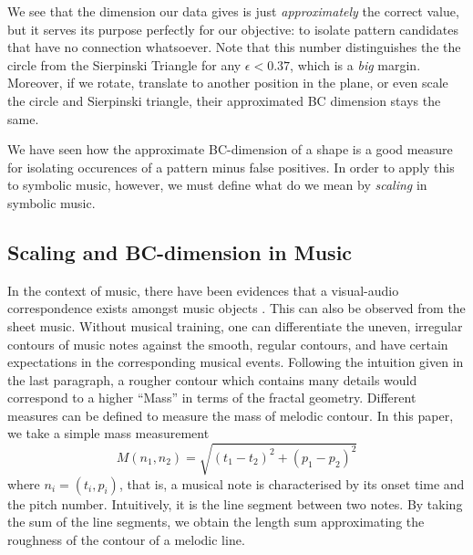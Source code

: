   We see that the dimension our data gives is just
\emph{approximately} the correct value, but it serves its purpose
perfectly for our objective: to isolate pattern candidates that have
no connection whatsoever. Note that this number distinguishes the
the circle from the Sierpinski Triangle for any $\epsilon < 0.37$,
which is a \emph{big} margin. Moreover, if we rotate, translate 
to another position in the plane, or even scale the circle and
Sierpinski triangle, their approximated BC dimension stays the same.


  We have seen how the approximate BC-dimension of a shape is a good
measure for isolating occurences of a pattern minus false positives.
In order to apply this to symbolic music, however, we must define what
do we mean by \emph{scaling} in symbolic music.

\subsection{Scaling and BC-dimension in Music}
In the context of music, there have been evidences that a visual-audio correspondence exists amongst music objects \cite{thorpe2016perception}.
This can also be observed from the sheet music.
Without musical training, one can differentiate the uneven, irregular contours of music notes against the smooth, regular contours, and have certain expectations in the corresponding musical events.
Following the intuition given in the last paragraph, a rougher contour which contains many details would correspond to a higher ``Mass'' in terms of the fractal geometry.
Different measures can be defined to measure the mass of melodic contour.
In this paper, we take a simple mass measurement
$$M(n_1, n_2) = \sqrt{(t_1-t_2)^2 +(p_1-p_2)^2}$$
  where $n_i=(t_i, p_i)$, that is, a musical note is characterised by its onset time and the pitch number. 
Intuitively, it is the line segment between two notes.
By taking the sum of the line segments, we obtain the length sum approximating the roughness of the contour of a melodic line.

